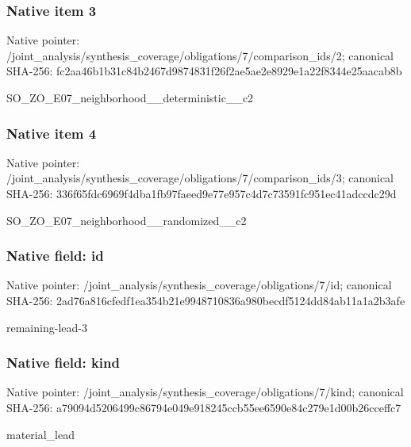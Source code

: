 \documentclass[10pt,a4paper]{article}
\begin{document}
\subsubsection{Native item 3}
Native pointer: /joint\_\allowbreak{}analysis/synthesis\_\allowbreak{}coverage/obligations/7/comparison\_\allowbreak{}ids/2; canonical SHA-256: fc2aa46b1b31c84b2467d9874831f26f2ae5ae2e8929e1a22f8344e25aacab8b

\begingroup\raggedright\sloppy SO\_\allowbreak{}ZO\_\allowbreak{}E07\_\allowbreak{}neighborhood\_\allowbreak{}\_\allowbreak{}deterministic\_\allowbreak{}\_\allowbreak{}c2\par\endgroup

\subsubsection{Native item 4}
Native pointer: /joint\_\allowbreak{}analysis/synthesis\_\allowbreak{}coverage/obligations/7/comparison\_\allowbreak{}ids/3; canonical SHA-256: 336f65fdc6969f4dba1fb97faeed9e77e957c4d7c73591fc951ec41adccdc29d

\begingroup\raggedright\sloppy SO\_\allowbreak{}ZO\_\allowbreak{}E07\_\allowbreak{}neighborhood\_\allowbreak{}\_\allowbreak{}randomized\_\allowbreak{}\_\allowbreak{}c2\par\endgroup

\subsubsection{Native field: id}
Native pointer: /joint\_\allowbreak{}analysis/synthesis\_\allowbreak{}coverage/obligations/7/id; canonical SHA-256: 2ad76a816cfedf1ea354b21e9948710836a980becdf5124dd84ab11a1a2b3afe

\begingroup\raggedright\sloppy remaining-lead-3\par\endgroup

\subsubsection{Native field: kind}
Native pointer: /joint\_\allowbreak{}analysis/synthesis\_\allowbreak{}coverage/obligations/7/kind; canonical SHA-256: a79094d5206499c86794e049e918245ccb55ee6590e84c279e1d00b26cceffc7

\begingroup\raggedright\sloppy material\_\allowbreak{}lead\par\endgroup
\end{document}

